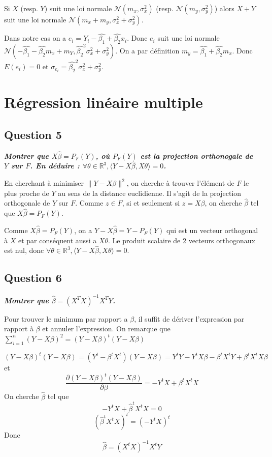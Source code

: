 \documentclass[pdflatex]{article}
\theoremstyle{definition}
\newcommand{\bb}[1]{\mathbb{#1}}
\newcommand{\R}{\bb{R}}
\newcommand{\quest}[1]{\textbf{\textit{#1}} \vspace{3mm}}
\begin{document}
Si $X$ (resp. $Y$) suit une loi normale $\mathscr{N}(m_x, \sigma_x^2)$ (resp. $\mathscr{N}(m_y, \sigma_y^2)$) alors $X+Y$ suit une loi normale $\mathscr{N}(m_x + m_y, \sigma_x^2+\sigma_y^2)$.

Dans notre cas on a $e_i = Y_i - \hat{\beta_1} + \hat{\beta_2}x_i$. Donc $e_i$ suit une loi normale  
$\mathscr{N}(- \hat{\beta_1} - \hat{\beta_2}m_x + m_Y, \hat{\beta_2}^2\sigma_x^2+\sigma_y^2)$. On a par d\'efinition $m_y = \hat{\beta_1} + \hat{\beta_2}m_x$. Donc $E(e_i) = 0$ et $\sigma_{e_i} = \hat{\beta_2}^2\sigma_x^2+\sigma_y^2$.

\section*{R\'egression lin\'eaire multiple}
\subsection*{Question 5}
\quest{Montrer que $X\hat{\beta} = P_F(Y)$, o\`u $P_F(Y)$ est la projection orthonogale de $Y$ sur $F$. En d\'eduire : $\forall \theta \in \R^3, \langle Y - X\hat{\beta}, X\theta \rangle = 0$.}

En cherchant \`a minimiser $\lVert Y - X\beta \rVert^2$, on cherche \`a trouver l'\'el\'ement de $F$ le plus proche de $Y$ au sens de la distance euclidienne. Il s'agit de la projection orthogonale de $Y$ sur $F$. Comme $z \in F$, si et seulement si $z = X\beta$, on cherche $\hat{\beta}$ tel que $X\hat{\beta} = P_F(Y)$. 

Comme $X\hat{\beta} = P_F(Y)$, on a $Y - X\hat{\beta} = Y - P_F(Y)$ qui est un vecteur orthogonal \`a $X$ et par cons\'equent aussi a $X\theta$. Le produit scalaire de 2 vecteurs orthogonaux est nul, donc $\forall \theta \in \R^{3}, \langle Y - X\hat{\beta}, X\theta \rangle = 0$.

\subsection*{Question 6}
\quest{Montrer que $\hat{\beta} = (X^TX)^{-1}X^TY$.}

Pour trouver le minimum par rapport a $\beta$, il suffit de d\'eriver l'expression par rapport \`a $\beta$ et annuler l'expression. On remarque que $\sum_{i=1}^{n}{(Y-X\beta)^2} = (Y-X\beta)^t(Y-X\beta)$

$$
(Y-X\beta)^t(Y-X\beta) = (Y^t-\beta^tX^t)(Y-X\beta) = Y^tY-Y^tX\beta - \beta^tX^tY + \beta^tX^tX\beta
$$
et
$$
\frac{\partial (Y-X\beta)^t(Y-X\beta) }{\partial \beta} = -Y^tX + \beta^tX^tX
$$
On cherche $\hat{\beta}$ tel que
$$
-Y^tX + \hat{\beta}^tX^tX = 0
$$
$$
(\hat{\beta}^tX^tX)^t = (-Y^tX)^t
$$
Donc
$$
\hat{\beta} = (X^tX)^{-1}X^tY
$$
\end{document}
